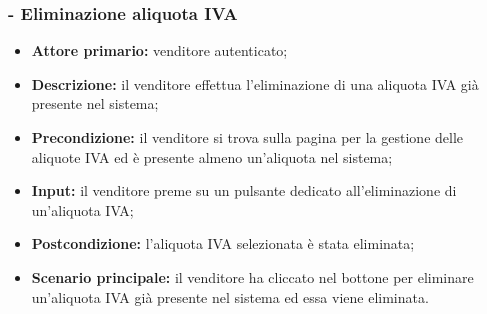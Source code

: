 \stepsubUserCase
\subsubsection{- Eliminazione aliquota IVA}
\begin{itemize}
    \item \textbf{Attore primario:} venditore autenticato;
    \item \textbf{Descrizione:} il venditore effettua l'eliminazione di una aliquota IVA già presente nel sistema;
    \item \textbf{Precondizione:} il venditore si trova sulla pagina per la gestione delle aliquote IVA ed è presente almeno un'aliquota nel sistema;
    \item \textbf{Input:} il venditore preme su un pulsante dedicato all'eliminazione di un'aliquota IVA;
    \item \textbf{Postcondizione:} l'aliquota IVA selezionata è stata eliminata;
    \item \textbf{Scenario principale:} il venditore ha cliccato nel bottone per eliminare un’aliquota IVA già presente nel sistema ed essa viene eliminata.
\end{itemize}

\stepUserCase

